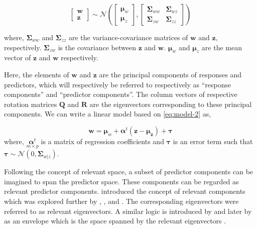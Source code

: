 \documentclass[review]{elsarticle}
\begin{document}
\begin{equation}
  \begin{bmatrix}
    \mathbf{w} \\ \mathbf{z}
  \end{bmatrix} \sim \mathcal{N}
  \left(
    \begin{bmatrix}
      \boldsymbol{\mu}_w \\
      \boldsymbol{\mu}_z
    \end{bmatrix},
    \begin{bmatrix}
    \boldsymbol{\Sigma}_{ww} & \boldsymbol{\Sigma}_{wz} \\
    \boldsymbol{\Sigma}_{zw} & \boldsymbol{\Sigma}_{zz}
    \end{bmatrix}
  \right)
  \label{eq:model-2}
\end{equation}

where, \(\boldsymbol{\Sigma}_{ww}\) and \(\boldsymbol{\Sigma}_{zz}\) are the variance-covariance matrices of \(\mathbf{w}\) and \(\mathbf{z}\), respectively. \(\boldsymbol{\Sigma}_{zw}\) is the covariance between \(\mathbf{z}\) and \(\mathbf{w}\). \(\boldsymbol{\mu}_w\) and \(\boldsymbol{\mu}_z\) are the mean vector of \(\mathbf{z}\) and \(\mathbf{w}\) respectively.

Here, the elements of \(\mathbf{w}\) and \(\mathbf{z}\) are the principal components of responses and predictors, which will respectively be referred to respectively as ``response components'' and ``predictor components''. The column vectors of respective rotation matrices \(\mathbf{Q}\) and \(\mathbf{R}\) are the eigenvectors corresponding to these principal components. We can write a linear model based on \eqref{eq:model-2} as,

\begin{equation}
\mathbf{w} = \boldsymbol{\mu}_w + \boldsymbol{\alpha}^t(\mathbf{z} - \boldsymbol{\mu_z}) + \boldsymbol{\tau}
\label{eq:reg-model-2}
\end{equation}
where, \(\underset{m\times p}{\boldsymbol{\alpha}^t}\) is a matrix of regression coefficients and \(\boldsymbol{\tau}\) is an error term such that \(\boldsymbol{\tau} \sim \mathcal{N}(0, \boldsymbol{\Sigma}_{w|z})\).

Following the concept of relevant space, a subset of predictor components can be imagined to span the predictor space. These components can be regarded as relevant predictor components. \citet{Naes1985} introduced the concept of relevant components which was explored further by \citet{helland1990partial}, \citet{naes1993relevant}, \citet{Helland1994b} and \citet{Helland2000}. The corresponding eigenvectors were referred to as relevant eigenvectors. A similar logic is introduced by \citet{cook2010envelope} and later by \citet{cook2013envelopes} as an envelope which is the space spanned by the relevant eigenvectors \citep[pp.~101]{cook2018envelope}.
\end{document}
